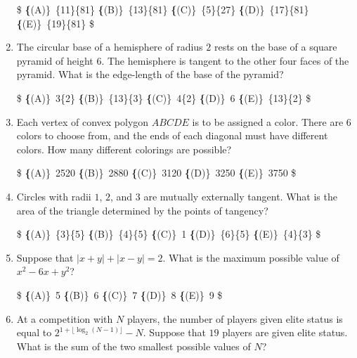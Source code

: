 \documentclass{article}
\begin{document}
\begin{enumerate}[label=\arabic*., itemsep=0.5em]
\$
\textbf\{(A)\}\ \frac\{11\}\{81\} \qquad
\textbf\{(B)\}\ \frac\{13\}\{81\} \qquad
\textbf\{(C)\}\ \frac\{5\}\{27\} \qquad
\textbf\{(D)\}\ \frac\{17\}\{81\} \qquad
\textbf\{(E)\}\ \frac\{19\}\{81\} \$\par \vspace{0.5em}\item The circular base of a hemisphere of radius $2$ rests on the base of a square pyramid of height $6$. The hemisphere is tangent to the other four faces of the pyramid. What is the edge-length of the base of the pyramid?

\$
\textbf\{(A)\}\ 3\sqrt\{2\} \qquad
\textbf\{(B)\}\ \frac\{13\}\{3\} \qquad
\textbf\{(C)\}\ 4\sqrt\{2\} \qquad
\textbf\{(D)\}\ 6 \qquad
\textbf\{(E)\}\ \frac\{13\}\{2\} \$\par \vspace{0.5em}\item Each vertex of convex polygon $ABCDE$ is to be assigned a color. There are $6$ colors to choose from, and the ends of each diagonal must have different colors. How many different colorings are possible?

\$
\textbf\{(A)\}\ 2520 \qquad
\textbf\{(B)\}\ 2880 \qquad
\textbf\{(C)\}\ 3120 \qquad
\textbf\{(D)\}\ 3250 \qquad
\textbf\{(E)\}\ 3750 \$\par \vspace{0.5em}\item Circles with radii $1$, $2$, and $3$ are mutually externally tangent. What is the area of the triangle determined by the points of tangency?

\$
\textbf\{(A)\}\ \frac\{3\}\{5\} \qquad
\textbf\{(B)\}\ \frac\{4\}\{5\} \qquad
\textbf\{(C)\}\ 1 \qquad
\textbf\{(D)\}\ \frac\{6\}\{5\} \qquad
\textbf\{(E)\}\ \frac\{4\}\{3\} \$\par \vspace{0.5em}\item Suppose that $\left|x+y\right|+\left|x-y\right|=2$. What is the maximum possible value of $x^2-6x+y^2$?

\$
\textbf\{(A)\}\ 5 \qquad
\textbf\{(B)\}\ 6 \qquad
\textbf\{(C)\}\ 7 \qquad
\textbf\{(D)\}\ 8 \qquad
\textbf\{(E)\}\ 9 \$\par \vspace{0.5em}\item At a competition with $N$ players, the number of players given elite status is equal to $2^{1+\lfloor \log_{2} (N-1) \rfloor}-N$. Suppose that $19$ players are given elite status. What is the sum of the two smallest possible values of $N$?


\end{enumerate}
\end{document}
